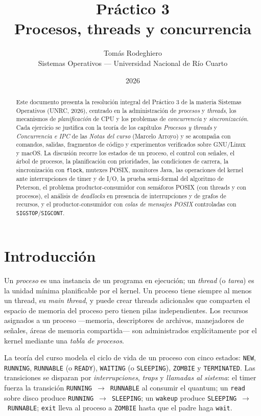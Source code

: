 \documentclass[11pt,a4paper]{article}
\title{
    \vspace{-2.5em}
    \textbf{Práctico 3} \\[0.3em]
    \large Procesos, threads y concurrencia
}
\author{
    Tomás Rodeghiero \\
    \small Sistemas Operativos --- Universidad Nacional de Río Cuarto
}
\date{2026}
\begin{document}
\maketitle

\begin{abstract}
\noindent
Este documento presenta la resolución integral del Práctico 3 de la
materia Sistemas Operativos (UNRC, 2026), centrado en la administración
de \emph{procesos} y \emph{threads}, los mecanismos de \emph{planificación}
de CPU y los problemas de \emph{concurrencia} y \emph{sincronización}.
Cada ejercicio se justifica con la teoría de los capítulos
\emph{Procesos y threads} y \emph{Concurrencia e IPC} de las
\emph{Notas del curso} (Marcelo Arroyo) y se acompaña con comandos,
salidas, fragmentos de código y experimentos verificados sobre
GNU/Linux y macOS. La discusión recorre los estados de un proceso, el
control con señales, el árbol de procesos, la planificación con prioridades,
las condiciones de carrera, la sincronización con \texttt{flock}, mutexes
POSIX, monitores Java, las operaciones del kernel ante interrupciones de
timer y de I/O, la prueba semi-formal del algoritmo de Peterson, el
problema productor-consumidor con semáforos POSIX (con threads y con
procesos), el análisis de \emph{deadlocks} en presencia de interrupciones
y de grafos de recursos, y el productor-consumidor con \emph{colas de
mensajes POSIX} controladas con \texttt{SIGSTOP}/\texttt{SIGCONT}.
\end{abstract}

\tableofcontents
\bigskip

\section{Introducción}

Un \emph{proceso} es una instancia de un programa en ejecución; un
\emph{thread} (o \emph{tarea}) es la unidad mínima planificable por el
kernel. Un proceso tiene siempre al menos un thread, su \emph{main
thread}, y puede crear threads adicionales que comparten el espacio de
memoria del proceso pero tienen pilas independientes. Los recursos
asignados a un proceso ---memoria, descriptores de archivos, manejadores
de señales, áreas de memoria compartida--- son administrados
explícitamente por el kernel mediante una \emph{tabla de procesos}.

La teoría del curso modela el ciclo de vida de un proceso con cinco
estados: \texttt{NEW}, \texttt{RUNNING}, \texttt{RUNNABLE} (o
\texttt{READY}), \texttt{WAITING} (o \texttt{SLEEPING}), \texttt{ZOMBIE}
y \texttt{TERMINATED}. Las transiciones se disparan por
\emph{interrupciones}, \emph{traps} y \emph{llamadas al sistema}: el
timer fuerza la transición \texttt{RUNNING}~$\rightarrow$~\texttt{RUNNABLE}
al consumir el quantum; un \texttt{read} sobre disco produce
\texttt{RUNNING}~$\rightarrow$~\texttt{SLEEPING}; un \texttt{wakeup}
produce \texttt{SLEEPING}~$\rightarrow$~\texttt{RUNNABLE}; \texttt{exit}
lleva al proceso a \texttt{ZOMBIE} hasta que el padre haga \texttt{wait}.
\end{document}
